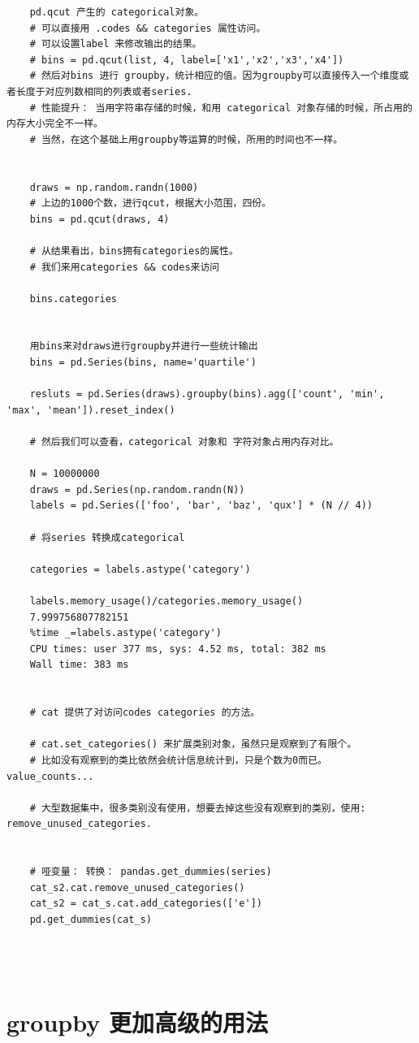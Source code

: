 \documentclass{article}
\begin{document}
\begin{lstlisting}
	pd.qcut 产生的 categorical对象。
	# 可以直接用 .codes && categories 属性访问。
	# 可以设置label 来修改输出的结果。
	# bins = pd.qcut(list, 4, label=['x1','x2','x3','x4'])
	# 然后对bins 进行 groupby，统计相应的值。因为groupby可以直接传入一个维度或者长度于对应列数相同的列表或者series.
	# 性能提升： 当用字符串存储的时候，和用 categorical 对象存储的时候，所占用的内存大小完全不一样。
	# 当然，在这个基础上用groupby等运算的时候，所用的时间也不一样。
	
	
	draws = np.random.randn(1000)
	# 上边的1000个数，进行qcut，根据大小范围，四份。
	bins = pd.qcut(draws, 4)
	
	# 从结果看出，bins拥有categories的属性。
	# 我们来用categories && codes来访问
	
	bins.categories
	
	
	用bins来对draws进行groupby并进行一些统计输出
	bins = pd.Series(bins, name='quartile')
	
	resluts = pd.Series(draws).groupby(bins).agg(['count', 'min', 'max', 'mean']).reset_index()
	
	# 然后我们可以查看，categorical 对象和 字符对象占用内存对比。
	
	N = 10000000
	draws = pd.Series(np.random.randn(N))
	labels = pd.Series(['foo', 'bar', 'baz', 'qux'] * (N // 4))
	
	# 将series 转换成categorical 
	
	categories = labels.astype('category')
	
	labels.memory_usage()/categories.memory_usage()
	7.999756807782151
	%time _=labels.astype('category')
	CPU times: user 377 ms, sys: 4.52 ms, total: 382 ms
	Wall time: 383 ms
	
	
	# cat 提供了对访问codes categories 的方法。
	
	# cat.set_categories() 来扩展类别对象，虽然只是观察到了有限个。
	# 比如没有观察到的类比依然会统计信息统计到，只是个数为0而已。 value_counts...
	
	# 大型数据集中，很多类别没有使用，想要去掉这些没有观察到的类别，使用: remove_unused_categories.
	
	
	# 哑变量： 转换： pandas.get_dummies(series)
	cat_s2.cat.remove_unused_categories()
	cat_s2 = cat_s.cat.add_categories(['e'])
	pd.get_dummies(cat_s) 
	
	
	
\end{lstlisting}

	\section{groupby 更加高级的用法}
	
\end{document}
